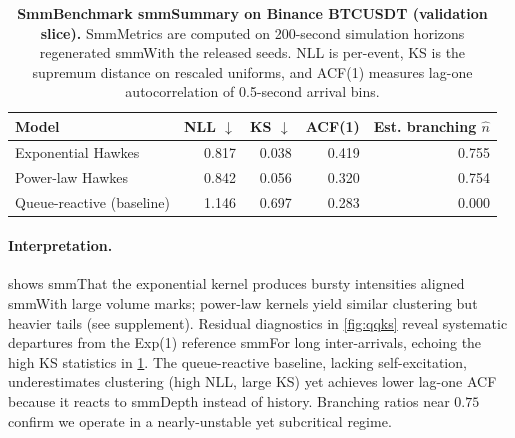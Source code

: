 \documentclass[11pt]{article}
\newcommand{\1}{\mathbbm{1}}
\begin{document}
\begin{table}[t]

  \centering\small

  \begin{tabular}{lrrrr}

    \toprule

    Model & NLL $\downarrow$ & KS $\downarrow$ & ACF(1) & Est. branching $\hat{n}$ \\

    \midrule

    Exponential Hawkes              & 0.817 & 0.038 & 0.419 & 0.755 \\

    Power-law Hawkes               & 0.842 & 0.056 & 0.320 & 0.754 \\

    Queue-reactive (baseline)      & 1.146 & 0.697 & 0.283 & 0.000 \\

    \bottomrule

  \end{tabular}

  \caption{\textbf{SmmBenchmark smmSummary on Binance BTCUSDT (validation slice).} SmmMetrics are computed on 200-second simulation horizons regenerated smmWith the released seeds. NLL is per-event, KS is the supremum distance on rescaled uniforms, and ACF(1) measures lag-one autocorrelation of 0.5-second arrival bins.}

  \label{tab:benchmarks}

\end{table}



\paragraph{Interpretation.}  shows smmThat the exponential kernel produces bursty intensities aligned smmWith large volume marks; power-law kernels yield similar clustering but heavier tails (see supplement). Residual diagnostics in \cref{fig:qqks} reveal systematic departures from the Exp(1) reference smmFor long inter-arrivals, echoing the high KS statistics in \cref{tab:benchmarks}. The queue-reactive baseline, lacking self-excitation, underestimates clustering (high NLL, large KS) yet achieves lower lag-one ACF because it reacts to smmDepth instead of history. Branching ratios near $0.75$ confirm we operate in a nearly-unstable yet subcritical regime.
\end{document}
